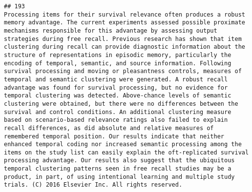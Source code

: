 \documentclass[
  english,
  man]{apa6}
\begin{document}
\begin{verbatim}
## 193                                                                                                                                                                                                                                                                                                                                                                                                                                                                                                                                                                                                                                                                                                                                                                                                                                                                                                                                                                                                                                                                                                                                                            Processing items for their survival relevance often produces a robust memory advantage. The current experiments assessed possible proximate mechanisms responsible for this advantage by assessing output strategies during free recall. Previous research has shown that item clustering during recall can provide diagnostic information about the structure of representations in episodic memory, particularly the encoding of temporal, semantic, and source information. Following survival processing and moving or pleasantness controls, measures of temporal and semantic clustering were generated. A robust recall advantage was found for survival processing, but no evidence for temporal clustering was detected. Above-chance levels of semantic clustering were obtained, but there were no differences between the survival and control conditions. An additional clustering measure based on scenario-based relevance ratings also failed to explain recall differences, as did absolute and relative measures of remembered temporal position. Our results indicate that neither enhanced temporal coding nor increased semantic processing among the items on the study list can easily explain the oft-replicated survival processing advantage. Our results also suggest that the ubiquitous temporal clustering patterns seen in free recall studies may be a product, in part, of using intentional learning and multiple study trials. (C) 2016 Elsevier Inc. All rights reserved.

\end{verbatim}
\end{document}
